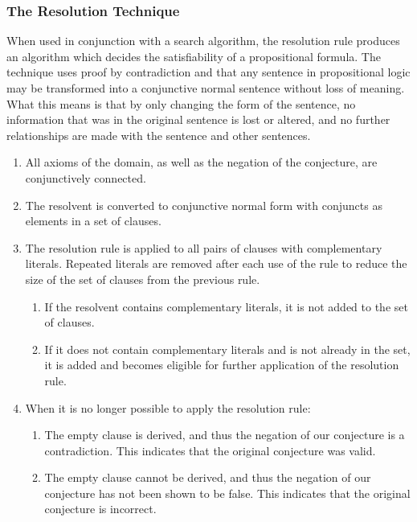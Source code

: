 \subsubsection{The Resolution Technique}

When used in conjunction with a search algorithm, the resolution rule produces an algorithm which decides the satisfiability of a propositional formula. The technique uses proof by contradiction and that any sentence in propositional logic may be transformed into a conjunctive normal sentence without loss of meaning. What this means is that by only changing the form of the sentence, no information that was in the original sentence is lost or altered, and no further relationships are made with the sentence and other sentences.

\begin{enumerate}
	\item All axioms of the domain, as well as the negation of the conjecture, are conjunctively connected.
	\item The resolvent is converted to conjunctive normal form with conjuncts as elements in a set of clauses.
	\item The resolution rule is applied to all pairs of clauses with complementary literals. Repeated literals are removed after each use of the rule to reduce the size of the set of clauses from the previous rule.
		\begin{enumerate}
			\item If the resolvent contains complementary literals, it is not added to the set of clauses.
			\item If it does not contain complementary literals and is not already in the set, it is added and becomes eligible for further application of the resolution rule.
		\end{enumerate}
	\item When it is no longer possible to apply the resolution rule:
		\begin{enumerate}
			\item The empty clause is derived, and thus the negation of our conjecture is a contradiction. This indicates that the original conjecture was valid.
			\item The empty clause cannot be derived, and thus the negation of our conjecture has not been shown to be false. This indicates that the original conjecture is incorrect.
		\end{enumerate}
\end{enumerate}

